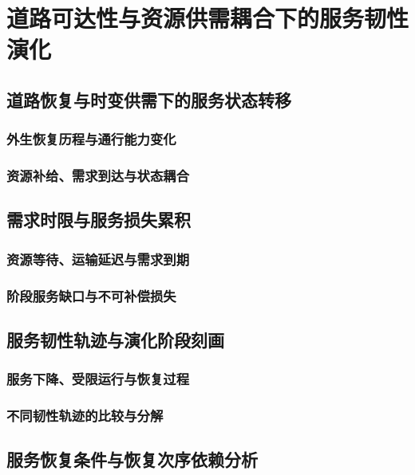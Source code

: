 \chapter{道路可达性与资源供需耦合下的服务韧性演化}
\label{chap:resilience}

\section{道路恢复与时变供需下的服务状态转移}
\subsection{外生恢复历程与通行能力变化}
\subsection{资源补给、需求到达与状态耦合}

\ThesisBlank

\section{需求时限与服务损失累积}
\subsection{资源等待、运输延迟与需求到期}
\subsection{阶段服务缺口与不可补偿损失}

\ThesisBlank

\section{服务韧性轨迹与演化阶段刻画}
\subsection{服务下降、受限运行与恢复过程}
\subsection{不同韧性轨迹的比较与分解}

\ThesisBlank

\section{服务恢复条件与恢复次序依赖分析}
